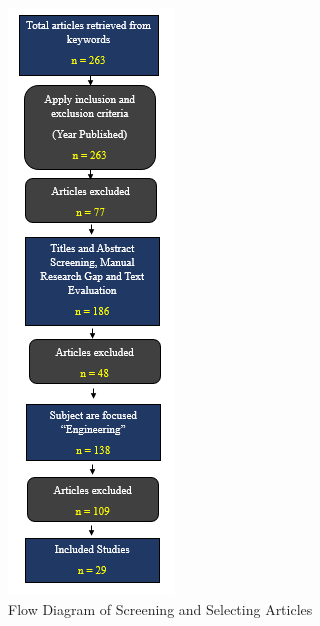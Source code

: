 \documentclass[journal, a4paper]{IEEEtran}
\begin{document}
\begin{figure}[h]
  \centering
  \includegraphics[height=2\columnwidth]{./img/methods_flowchart.png}
  \caption{Flow Diagram of Screening and Selecting Articles}
  \label{fig:paperFilter}
\end{figure}
\end{document}
